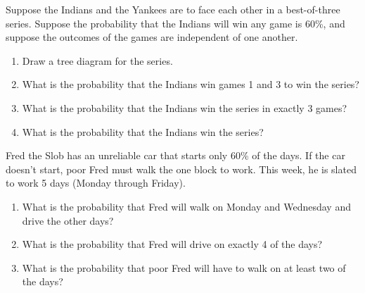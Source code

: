 \documentclass[nooutcomes]{ximera}
\begin{document}
\newpage

\begin{problem}
Suppose the Indians and the Yankees are to face each other in a best-of-three series.  Suppose the probability that the Indians will win any game is 60\%, and suppose the outcomes of the games are independent of one another.  
\begin{enumerate}
\item Draw a tree diagram for the series.  
\item What is the probability that the Indians win games 1 and 3 to win the series?
\item What is the probability that the Indians win the series in exactly 3 games?
\item What is the probability that the Indians win the series?
\end{enumerate}
\end{problem}


\begin{problem} 
Fred the Slob has an unreliable car that starts only 60\% of the days.
If the car doesn't start, poor Fred must walk the one block to work.
This week, he is slated to work 5 days (Monday through Friday).  
\begin{enumerate}
\item What is the probability that Fred will walk on Monday and Wednesday
and drive the other days?
\item What is the probability that Fred will drive on exactly 4 of the days? 
\item What is the probability that poor Fred will have to walk on at least two of the days?
\end{enumerate}
\end{problem}



\end{document}
